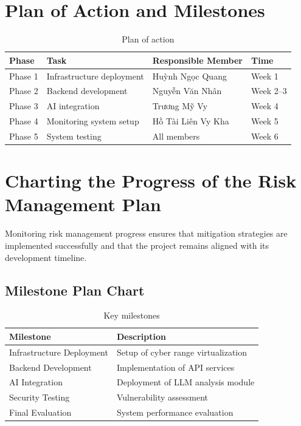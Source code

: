 \section{Plan of Action and Milestones}
\begin{table}[H]
    \centering
    \renewcommand{\arraystretch}{1.2}
    \begin{tabularx}{\textwidth}{|X|X|X|X|}
        \hline
        \textbf{Phase} & \textbf{Task} & \textbf{Responsible Member} & \textbf{Time} \\
        \hline
        Phase 1 & Infrastructure deployment & Huỳnh Ngọc Quang & Week 1 \\
        \hline
        Phase 2 & Backend development & Nguyễn Văn Nhân & Week 2--3 \\
        \hline
        Phase 3 & AI integration & Trương Mỹ Vy & Week 4 \\
        \hline
        Phase 4 & Monitoring system setup & Hồ Tài Liên Vy Kha & Week 5 \\
        \hline
        Phase 5 & System testing & All members & Week 6 \\
        \hline
    \end{tabularx}
    \caption{Plan of action}
\end{table}

\section{Charting the Progress of the Risk Management Plan}
Monitoring risk management progress ensures that mitigation strategies are implemented successfully and that the project remains aligned with its development timeline.

\subsection{Milestone Plan Chart}
\begin{table}[H]
    \centering
    \renewcommand{\arraystretch}{1.2}
    \begin{tabularx}{\textwidth}{|X|X|}
        \hline
        \textbf{Milestone} & \textbf{Description} \\
        \hline
        Infrastructure Deployment & Setup of cyber range virtualization \\
        \hline
        Backend Development & Implementation of API services \\
        \hline
        AI Integration & Deployment of LLM analysis module \\
        \hline
        Security Testing & Vulnerability assessment \\
        \hline
        Final Evaluation & System performance evaluation \\
        \hline
    \end{tabularx}
    \caption{Key milestones}
\end{table}

